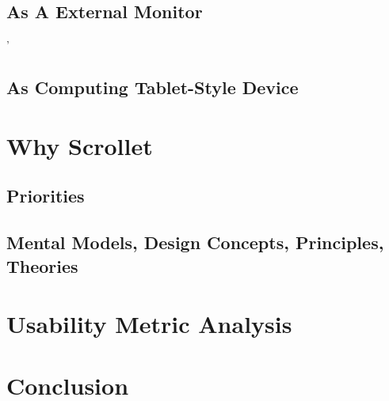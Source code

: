 \documentclass[a4paper]{article}
\begin{document}
\subsection{As A External Monitor}
'

\subsection{As Computing Tablet-Style Device}

\section{Why Scrollet}

\subsection{Priorities}
\subsection{Mental Models, Design Concepts, Principles, Theories}

\section{Usability Metric Analysis}

\section{Conclusion}
\end{document}
